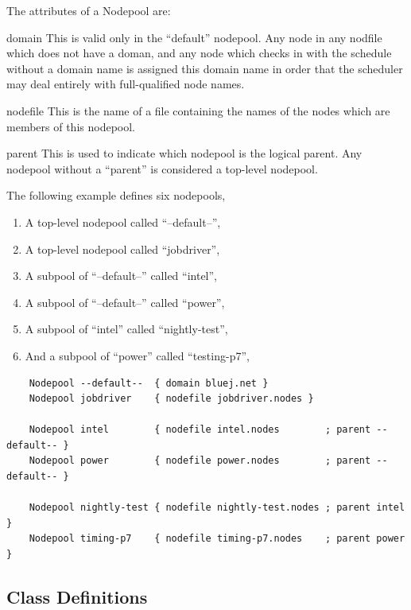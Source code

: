     The attributes of a Nodepool are:
    \begin{definition}
      \item[domain] This is valid only in the ``default'' nodepool.  Any node
        in any nodfile which does not have a doman, and any node which checks
        in with the schedule without a domain name is assigned this domain name
        in order that the scheduler may deal entirely with full-qualified node names.
      \item[nodefile] This is the name of a file containing the names of the nodes
        which are members of this nodepool.
      \item[parent] This is used to indicate which nodepool is the logical parent.
        Any nodepool without a ``parent'' is considered a top-level nodepool.
    \end{definition}
        
    The following example defines six nodepools, 
    \begin{enumerate}
      \item A top-level nodepool called ``--default--'',
      \item A top-level nodepool called ``jobdriver'',
      \item A subpool of ``--default--'' called ``intel'',
      \item A subpool of ``--default--'' called ``power'',
      \item A subpool of ``intel'' called ``nightly-test'',
      \item And a subpool of ``power'' called ``testing-p7'',
    \end{enumerate}
    
\begin{verbatim}
    Nodepool --default--  { domain bluej.net }
    Nodepool jobdriver    { nodefile jobdriver.nodes }
    
    Nodepool intel        { nodefile intel.nodes        ; parent --default-- }
    Nodepool power        { nodefile power.nodes        ; parent --default-- }

    Nodepool nightly-test { nodefile nightly-test.nodes ; parent intel }
    Nodepool timing-p7    { nodefile timing-p7.nodes    ; parent power }
\end{verbatim}
    
\subsection{Class Definitions}

